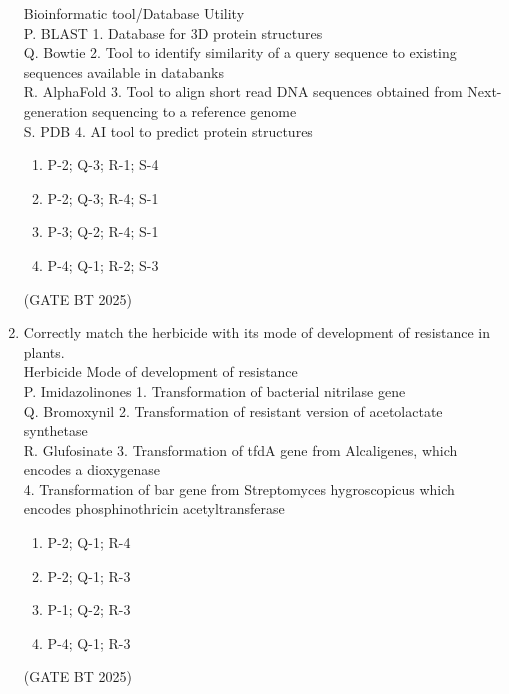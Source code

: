 \documentclass[journal,12pt,onecolumn]{IEEEtran}
\theoremstyle{remark}
\begin{document}
\begin{enumerate}
Bioinformatic tool/Database \hspace{1cm} Utility \\
P. BLAST \hspace{1cm} 1. Database for 3D protein structures \\
Q. Bowtie \hspace{1cm} 2. Tool to identify similarity of a query sequence to existing sequences available in databanks \\
R. AlphaFold \hspace{1cm} 3. Tool to align short read DNA sequences obtained from Next-generation sequencing to a reference genome \\
S. PDB \hspace{1cm} 4. AI tool to predict protein structures

\begin{enumerate}
    \item P-2; Q-3; R-1; S-4
    \item P-2; Q-3; R-4; S-1
    \item P-3; Q-2; R-4; S-1
    \item P-4; Q-1; R-2; S-3
\end{enumerate}
\hfill (GATE BT 2025)

\item Correctly match the herbicide with its mode of development of resistance in plants.\\

Herbicide \hspace{1cm} Mode of development of resistance \\
P. Imidazolinones \hspace{0.5cm} 1. Transformation of bacterial nitrilase gene \\
Q. Bromoxynil \hspace{1.3cm} 2. Transformation of resistant version of acetolactate synthetase \\
R. Glufosinate \hspace{1.3cm} 3. Transformation of tfdA gene from Alcaligenes, which encodes a dioxygenase \\
\hspace{3cm} 4. Transformation of bar gene from Streptomyces hygroscopicus which encodes phosphinothricin acetyltransferase

\begin{enumerate}
    \item P-2; Q-1; R-4
    \item P-2; Q-1; R-3
    \item P-1; Q-2; R-3
    \item P-4; Q-1; R-3
\end{enumerate}
\hfill (GATE BT 2025)


\end{enumerate}
\end{document}

